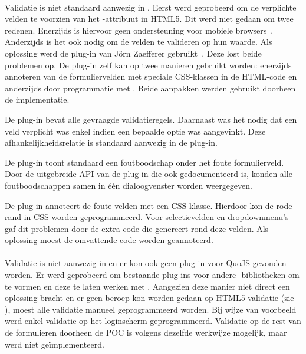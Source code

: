 \paragraph{\jqm}
Validatie is niet standaard aanwezig in \jqm. 
Eerst werd geprobeerd om de verplichte velden te voorzien van het -attribuut in HTML5. 
Dit werd niet gedaan om twee redenen.
Enerzijds is hiervoor geen ondersteuning voor mobiele browsers~\cite{Deveria2013c}. 
Anderzijds is het ook nodig om de velden te valideren op hun waarde.
Als oplossing werd de plug-in van Jörn Zaefferer gebruikt~\cite{Zaefferer2013}. 
Deze lost beide problemen op.
De plug-in zelf kan op twee manieren gebruikt worden: enerzijds annoteren van de formuliervelden met speciale CSS-klassen in de HTML-code en anderzijds door programmatie met \js{}. 
Beide aanpakken werden gebruikt doorheen de implementatie. 

De plug-in bevat alle gevraagde validatieregels.
Daarnaast was het nodig dat een veld verplicht was enkel indien een bepaalde optie was aangevinkt.
Deze afhankelijkheidsrelatie is standaard aanwezig in de plug-in.

De plug-in toont standaard een foutboodschap onder het foute formulierveld.
Door de uitgebreide API van de plug-in die ook gedocumenteerd is, konden alle foutboodschappen samen in één dialoogvenster worden weergegeven.

De plug-in annoteert de foute velden met een CSS-klasse.
Hierdoor kon de rode rand in CSS worden geprogrammeerd. 
Voor selectievelden en dropdownmenu's gaf dit problemen door de extra code die \jqm{} genereert rond deze velden.
Als oplossing moest de omvattende code worden geannoteerd.

\paragraph{\lungo}
Validatie is niet aanwezig in \lungo{} en er kon ook geen plug-in voor QuoJS gevonden worden.
Er werd geprobeerd om bestaande plug-ins voor andere \js{}-bibliotheken om te vormen en deze te laten werken met \quo{}.
Aangezien deze manier niet direct een oplossing bracht en er geen beroep kon worden gedaan op HTML5-validatie (zie \jqm{}), moest alle validatie manueel geprogrammeerd worden. 
Bij wijze van voorbeeld werd enkel validatie op het loginscherm geprogrammeerd.
Validatie op de rest van de formulieren doorheen de POC is volgens dezelfde werkwijze mogelijk, maar werd niet geïmplementeerd.

